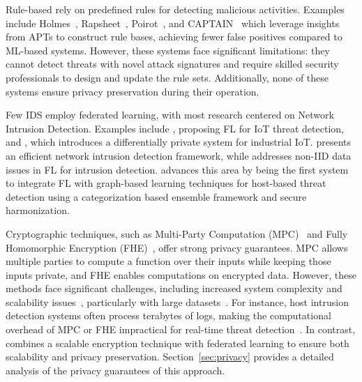  Rule-based \pids rely on predefined rules for detecting malicious activities. Examples include Holmes~\cite{holmes2019}, Rapsheet~\cite{rapsheet2020}, Poirot~\cite{poirot2019}, and CAPTAIN~\cite{wang2024incorporating} which leverage insights from APTs to construct rule bases, achieving fewer false positives compared to ML-based systems. However, these systems face significant limitations: they cannot detect threats with novel attack signatures and require skilled security professionals to design and update the rule sets. Additionally, none of these systems ensure privacy preservation during their operation.

 Few IDS employ federated learning, with most research centered on Network Intrusion Detection. Examples include \cite{man2021intelligent}, proposing FL for IoT threat detection, and \cite{friha20232df}, which introduces a differentially private system for industrial IoT. \cite{li2023efficient} presents an efficient network intrusion detection framework, while \cite{guo2023new} addresses non-IID data issues in FL for intrusion detection. \Sys advances this area by being the first system to integrate FL with graph-based learning techniques for host-based threat detection using a categorization based \gnnshort ensemble framework and secure \wordvec harmonization.

 Cryptographic techniques, such as Multi-Party Computation (MPC)~\cite{cramer2015secure} and Fully Homomorphic Encryption (FHE)~\cite{armknecht2015guide}, offer strong privacy guarantees. MPC allows multiple parties to compute a function over their inputs while keeping those inputs private, and FHE enables computations on encrypted data. However, these methods face significant challenges, including increased system complexity and scalability issues~\cite{du2001secure, gentry2009fully, asharov2013more}, particularly with large datasets~\cite{menezes2018handbook}. For instance, host intrusion detection systems often process terabytes of logs, making the computational overhead of MPC or FHE impractical for real-time threat detection~\cite{loggc}. In contrast, \Sys combines a scalable encryption technique with federated learning to ensure both scalability and privacy preservation. Section~\ref{sec:privacy} provides a detailed analysis of the privacy guarantees of this approach.

